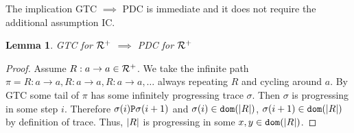 \documentclass{lmcs}
\newtheorem{lemma}[theorem]{Lemma}
\begin{document}
%
%

The implication GTC $\implies$ PDC is immediate and it does not require the 
additional assumption IC.

\begin{lemma}
GTC for ${\mathcal R}^+$ $\implies$  PDC for ${\mathcal R}^+$
\end{lemma}

\begin{proof}
Assume $R:a \rightarrow a \in {\mathcal R}^+$. We take the infinite path $\pi = R:a \rightarrow a, R:a \rightarrow a, R:a \rightarrow a,\ldots$ always repeating $R$ and cycling around $a$. By GTC some tail of $\pi$ has some infinitely progressing trace $\sigma$. Then $\sigma$ is progressing in some step $i$. Therefore $\sigma(i) {\tt P} \sigma(i+1)$ and $\sigma(i) \in {\tt dom}({| R |})$, $\sigma(i+1) \in {\tt dom}({| R |})$ by definition of trace. Thus, ${| R |}$ is progressing in some $x, y \in {\tt dom}({| R |})$. 
\end{proof}
\end{document}
